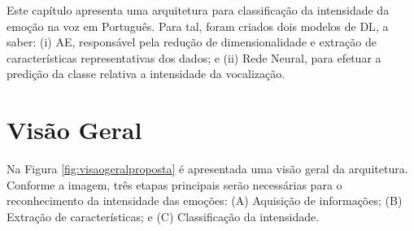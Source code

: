 


Este capítulo apresenta uma arquitetura para classificação da intensidade da emoção na voz em Português. Para tal, foram criados dois modelos de \acrshort{DL}, a saber: (i) \acrlong{AE}, responsável pela redução de dimensionalidade e extração de características representativas dos dados; e (ii) Rede Neural, para efetuar a predição da classe relativa a intensidade da vocalização.\\


\section{Visão Geral}

Na Figura \ref{fig:visaogeralproposta} é apresentada uma visão geral da arquitetura. Conforme a imagem, três etapas principais serão necessárias para o reconhecimento da intensidade das emoções: (A) Aquisição de informações; (B) Extração de características; e (C) Classificação da intensidade.

